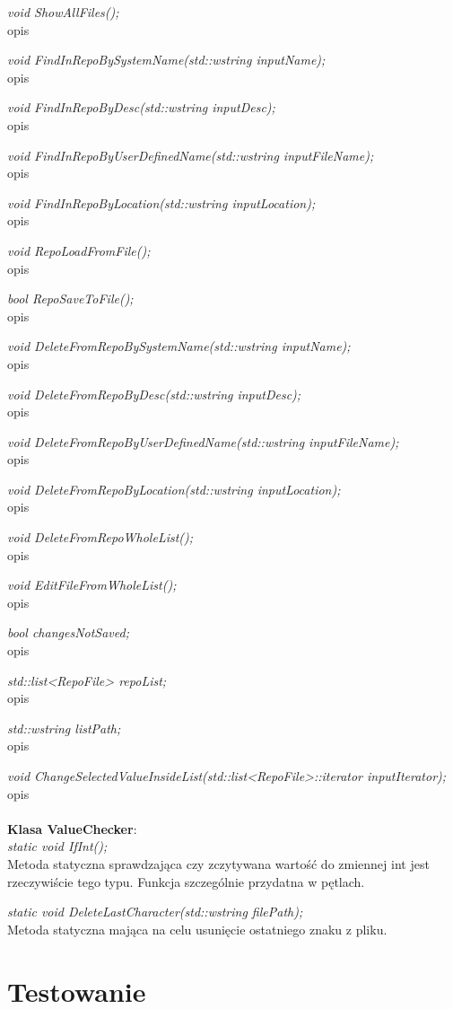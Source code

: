 \documentclass[10pt, a4paper]{article}
\begin{document}
\textit{void ShowAllFiles();}\\
opis

\textit{void FindInRepoBySystemName(std::wstring inputName);}\\
opis

\textit{void FindInRepoByDesc(std::wstring inputDesc);}\\
opis

\textit{void FindInRepoByUserDefinedName(std::wstring inputFileName);}\\
opis

\textit{void FindInRepoByLocation(std::wstring inputLocation);}\\
opis

\textit{void RepoLoadFromFile();}\\
opis

\textit{bool RepoSaveToFile();}\\
opis

\textit{void DeleteFromRepoBySystemName(std::wstring inputName);}\\
opis

\textit{void DeleteFromRepoByDesc(std::wstring inputDesc);}\\
opis

\textit{void DeleteFromRepoByUserDefinedName(std::wstring inputFileName);}\\
opis

\textit{void DeleteFromRepoByLocation(std::wstring inputLocation);}\\
opis

\textit{void DeleteFromRepoWholeList();}\\
opis

\textit{void EditFileFromWholeList();}\\
opis

\textit{bool changesNotSaved;}\\
opis

\textit{std::list<RepoFile> repoList;}\\
opis

\textit{std::wstring listPath;}\\
opis

\textit{void ChangeSelectedValueInsideList(std::list<RepoFile>::iterator inputIterator);}\\
opis
\\\\
\textbf{Klasa ValueChecker}:\\

\textit{static void IfInt();}\\
Metoda statyczna sprawdzająca czy zczytywana wartość do zmiennej int jest rzeczywiście tego typu. Funkcja szczególnie przydatna w pętlach.

\textit{static void DeleteLastCharacter(std::wstring filePath);}\\
Metoda statyczna mająca na celu usunięcie ostatniego znaku z pliku.


\section{Testowanie}
\end{document}

